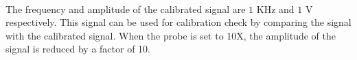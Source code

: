 \documentclass[11pt]{article}
\begin{document}
\begin{question}
{        \paragraph*{}
        The frequency and amplitude of the calibrated signal are $1$ KHz and $1$ V respectively. This signal can be used for calibration check by comparing the signal with the calibrated signal.
        When the probe is set to 10X, the amplitude of the signal is reduced by a factor of 10.

    }

\end{question}

\end{document}
